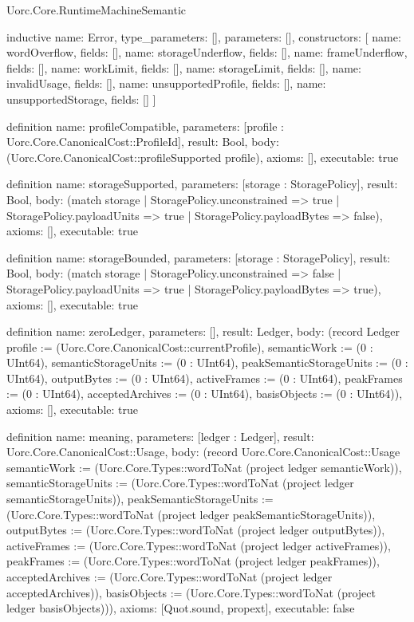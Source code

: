 \begin{lexlean}{Uorc.Core.RuntimeMachineSemantic}
\begin{semanticmodule}
inductive{
  name: Error,
  type_parameters: [],
  parameters: [],
  constructors: [
    {name: wordOverflow, fields: []},
    {name: storageUnderflow, fields: []},
    {name: frameUnderflow, fields: []},
    {name: workLimit, fields: []},
    {name: storageLimit, fields: []},
    {name: invalidUsage, fields: []},
    {name: unsupportedProfile, fields: []},
    {name: unsupportedStorage, fields: []}
  ]
}

definition{
  name: profileCompatible,
  parameters: [profile : Uorc.Core.CanonicalCost::ProfileId],
  result: Bool,
  body: (Uorc.Core.CanonicalCost::profileSupported profile),
  axioms: [],
  executable: true
}

definition{
  name: storageSupported,
  parameters: [storage : StoragePolicy],
  result: Bool,
  body: (match storage
    | StoragePolicy.unconstrained => true
    | StoragePolicy.payloadUnits => true
    | StoragePolicy.payloadBytes => false),
  axioms: [],
  executable: true
}

definition{
  name: storageBounded,
  parameters: [storage : StoragePolicy],
  result: Bool,
  body: (match storage
    | StoragePolicy.unconstrained => false
    | StoragePolicy.payloadUnits => true
    | StoragePolicy.payloadBytes => true),
  axioms: [],
  executable: true
}

definition{
  name: zeroLedger,
  parameters: [],
  result: Ledger,
  body: (record Ledger {profile := (Uorc.Core.CanonicalCost::currentProfile), semanticWork := (0 : UInt64), semanticStorageUnits := (0 : UInt64), peakSemanticStorageUnits := (0 : UInt64), outputBytes := (0 : UInt64), activeFrames := (0 : UInt64), peakFrames := (0 : UInt64), acceptedArchives := (0 : UInt64), basisObjects := (0 : UInt64)}),
  axioms: [],
  executable: true
}

definition{
  name: meaning,
  parameters: [ledger : Ledger],
  result: Uorc.Core.CanonicalCost::Usage,
  body: (record Uorc.Core.CanonicalCost::Usage {semanticWork := (Uorc.Core.Types::wordToNat (project ledger semanticWork)), semanticStorageUnits := (Uorc.Core.Types::wordToNat (project ledger semanticStorageUnits)), peakSemanticStorageUnits := (Uorc.Core.Types::wordToNat (project ledger peakSemanticStorageUnits)), outputBytes := (Uorc.Core.Types::wordToNat (project ledger outputBytes)), activeFrames := (Uorc.Core.Types::wordToNat (project ledger activeFrames)), peakFrames := (Uorc.Core.Types::wordToNat (project ledger peakFrames)), acceptedArchives := (Uorc.Core.Types::wordToNat (project ledger acceptedArchives)), basisObjects := (Uorc.Core.Types::wordToNat (project ledger basisObjects))}),
  axioms: [Quot.sound, propext],
  executable: false
}


\end{semanticmodule}
\end{lexlean}
